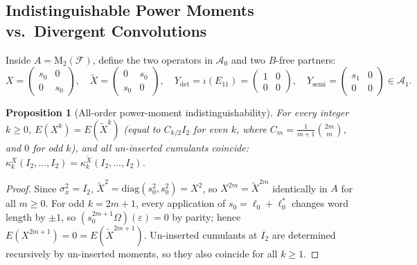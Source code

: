 \documentclass[11pt,a4paper]{article}
\newtheorem{proposition}[theorem]{Proposition}
\theoremstyle{definition}
\newcommand{\Mat}{\mathrm{M}}
\begin{document}
\subsection{Indistinguishable Power Moments vs.\ Divergent Convolutions}
Inside $A = \Mat_2(\mathcal{F})$, define the two operators in $\mathcal{A}_0$ and two $B$-free partners:
\[
X = \begin{pmatrix} s_0 & 0 \\ 0 & s_0 \end{pmatrix}, \quad
\tilde{X} = \begin{pmatrix} 0 & s_0 \\ s_0 & 0 \end{pmatrix}, \quad
Y_{\det} = \iota(E_{11}) = \begin{pmatrix} 1 & 0 \\ 0 & 0 \end{pmatrix}, \quad
Y_{\mathrm{semi}} = \begin{pmatrix} s_1 & 0 \\ 0 & 0 \end{pmatrix} \in \mathcal{A}_1.
\]

\begin{proposition}[All-order power-moment indistinguishability]\label{prop:same-moments}
For every integer $k \ge 0$, $E(X^k) = E(\tilde{X}^k)$ (equal to $C_{k/2} I_2$ for even $k$, where $C_m = \frac{1}{m+1}\binom{2m}{m}$, and $0$ for odd $k$), and all un-inserted cumulants coincide: $\kappa_k^X(I_2, \dots, I_2) = \kappa_k^{\tilde{X}}(I_2, \dots, I_2)$.
\end{proposition}
\begin{proof}
Since $\sigma_x^2 = I_2$, $\tilde{X}^2 = \mathrm{diag}(s_0^2, s_0^2) = X^2$, so $X^{2m} = \tilde{X}^{2m}$ identically in $A$ for all $m \ge 0$. For odd $k = 2m + 1$, every application of $s_0 = \ell_0 + \ell_0^*$ changes word length by $\pm 1$, so $(s_0^{2m+1}\Omega)(\varepsilon) = 0$ by parity; hence $E(X^{2m+1}) = 0 = E(\tilde{X}^{2m+1})$. Un-inserted cumulants at $I_2$ are determined recursively by un-inserted moments, so they also coincide for all $k \ge 1$.
\end{proof}
\end{document}
